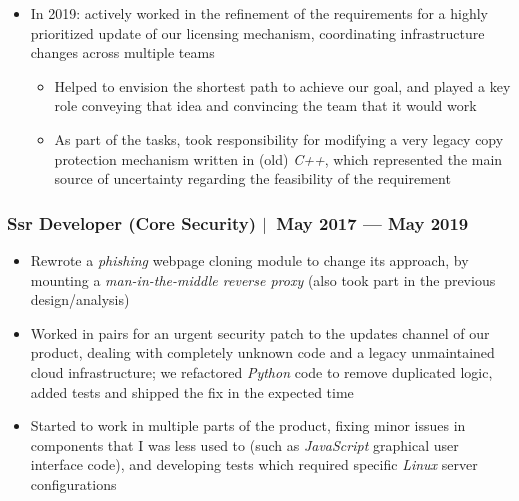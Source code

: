 \documentclass[12pt, a4paper]{article}
\newcommand{\mysep}{{\Large $\mid$}\ }
\newcommand{\python}{\emph{Python}}
\newcommand{\cpp}{\emph{C++}}
\begin{document}
\begin{itemize}
\begin{itemize}
            into our codebase, requiring changes in our non-standard \python{} build system
            (due to the way in which the interpreter is customized and embedded in the product)
            \item In the end, we finished with a renewed cryptography stack,
            removing legacy bindings and with a simpler mechanism to integrate third party libraries
        \end{itemize}
        \item In 2019: actively worked in the refinement of the requirements
        for a highly prioritized update of our licensing mechanism,
        coordinating infrastructure changes across multiple teams
        \begin{itemize}
            \item Helped to envision the shortest path to achieve our goal,
            and played a key role conveying that idea
            and convincing the team that it would work
            \item As part of the tasks, took responsibility for modifying
            a very legacy copy protection mechanism written in (old) \cpp{},
            which represented the main source of uncertainty
            regarding the feasibility of the requirement
        \end{itemize}
    \end{itemize}

    \subsubsection*{Ssr Developer (Core Security) \mysep May 2017 --- May 2019}
    \begin{itemize}
        \item Rewrote a \emph{phishing} webpage cloning module to change its approach,
        by mounting a \emph{man-in-the-middle reverse proxy}
        (also took part in the previous design/analysis)
        \item Worked in pairs for an urgent security patch
        to the updates channel of our product,
        dealing with completely unknown code
        and a legacy unmaintained cloud infrastructure;
        we refactored \python{} code to remove duplicated logic,
        added tests and shipped the fix in the expected time
        \item Started to work in multiple parts of the product,
        fixing minor issues in components that I was less used to
        (such as \emph{JavaScript} graphical user interface code),
        and developing tests which required specific \emph{Linux} server configurations
    \end{itemize}
\end{document}
